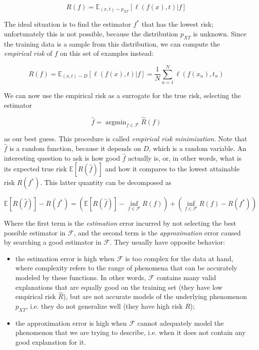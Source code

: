 \documentclass[a4paper]{book}
\DeclareMathOperator*{\argmin}{argmin}
\begin{document}
\begin{equation}
R(f)=\mathbb{E}_{(x,t)\sim p_{XT}}\left[\ell(f(x),t) \vert f \right]
\end{equation}

The ideal situation is to find the estimator $f^*$ that has the lowest risk; unfortunately this is not possible, because the distribution $p_{XT}$ is unknown. Since the training data is a sample from this distribution, we can compute the \emph{empirical risk} of $f$ on this set of examples instead:

\begin{equation}
\hat{R}(f)=\mathbb{E}_{(x,t)\sim D}\left[\ell(f(x),t)\vert f\right]=\frac{1}{N}\sum_{n=1}^N \ell(f(x_n),t_n)
\end{equation}

We can now use the empirical risk as a surrogate for the true risk, selecting the estimator

\begin{equation}
\hat{f}=\argmin_{f\in\mathcal{F}}\hat{R}(f)
\end{equation}

\noindent as our best guess. This procedure is called \emph{empirical risk minimization}. Note that $\hat{f}$ is a random function, because it depends on $D$, which is a random variable. An interesting question to ask is how good $\hat{f}$ actually is, or, in other words, what is its expected true risk $\mathbb{E}[R(\hat{f})]$ and how it compares to the lowest attainable risk $R(f^*)$. This latter quantity can be decomposed as

\begin{equation}
\mathbb{E}[R(\hat{f})]-R(f^*)=
\left(\mathbb{E}[R(\hat{f})]-\inf_{f\in\mathcal{F}} R(f)\right)
+\left(\inf_{f\in\mathcal{F}} R(f)-R(f^*)\right)
\end{equation}

Where the first term is the \emph{estimation} error incurred by not selecting the best possible estimator in $\mathcal{F}$, and the second term is the \emph{approximation} error caused by searching a good estimator in $\mathcal{F}$. They usually have opposite behavior:

\begin{itemize}
\item the estimation error is high when $\mathcal{F}$ is too complex for the data at hand, where complexity refers to the range of phenomena that can be accurately modeled by these functions. In other words, $\mathcal{F}$ contains many valid explanations that are equally good on the training set (they have low empirical risk $\hat{R}$), but are not accurate models of the underlying phenomenon $p_{XT}$, i.e. they do not generalize well (they have high risk $R$);
\item the approximation error is high when $\mathcal{F}$ cannot adequately model the phenomenon that we are trying to describe, i.e. when it does not contain any good explanation for it.
\end{itemize}
\end{document}
